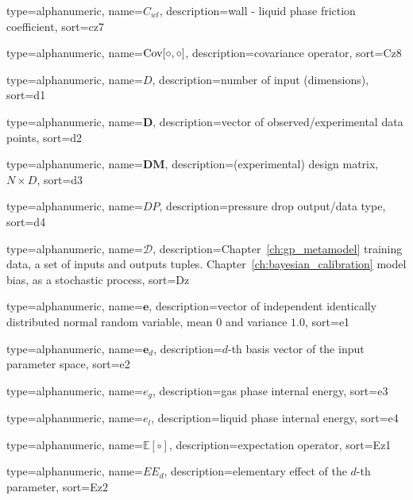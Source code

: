 {
  type=alphanumeric,
	name={\ensuremath{C_{wl}}},
	description={wall - liquid phase friction coefficient},
	sort={cz7}
}

{
  type=alphanumeric,
	name={\ensuremath{\textnormal{Cov}[\circ,\circ]}},
	description={covariance operator},
	sort={Cz8}
}

{
  type=alphanumeric,
	name={\ensuremath{D}},
	description={number of input (dimensions)},
	sort={d1}
}

{
  type=alphanumeric,
	name={\ensuremath{\mathbf{D}}},
	description={vector of observed/experimental data points},
	sort={d2}
}

{
  type=alphanumeric,
	name={\ensuremath{\mathbf{DM}}},
	description={(experimental) design matrix, $N \times D$},
	sort={d3}
}

{
  type=alphanumeric,
	name={\ensuremath{DP}},
	description={pressure drop output/data type},
	sort={d4}
}

{
  type=alphanumeric,
	name={\ensuremath{\mathcal{D}}},
	description={Chapter~\ref{ch:gp_metamodel} training data, a set of inputs and outputs tuples. \newline Chapter~\ref{ch:bayesian_calibration} model bias, as a stochastic process},
	sort={Dz}
}

{
  type=alphanumeric,
	name={\ensuremath{\mathbf{e}}},
	description={vector of independent identically distributed normal random variable, mean $0$ and variance $1.0$},
	sort={e1}
}

{
  type=alphanumeric,
	name={\ensuremath{\mathbf{e}_d}},
	description={$d$-th basis vector of the input parameter space},
	sort={e2}
}

{
  type=alphanumeric,
	name={\ensuremath{e_g}},
	description={gas phase internal energy},
	sort={e3}
}

{
  type=alphanumeric,
	name={\ensuremath{e_l}},
	description={liquid phase internal energy},
	sort={e4}
}

{
  type=alphanumeric,
	name={\ensuremath{\mathbb{E[\circ]}}},
	description={expectation operator},
	sort={Ez1}
}

{
  type=alphanumeric,
	name={\ensuremath{EE_d}},
	description={elementary effect of the $d$-th parameter},
	sort={Ez2}
}

